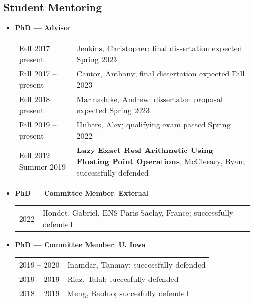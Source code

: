 \documentclass[10pt]{article}
\begin{document}
\begin{IOWA ONLY}
\subsection*{Student Mentoring}
\smallskip

\begin{itemize}

\item[] \textbf{PhD --- Advisor}
\\[1.3ex]
\begin{tabular}{l@{\quad\ }p{30em}} 
 Fall 2017 -- present
 & Jenkins, Christopher; final dissertation expected Spring 2023
 \\[.5ex]
 Fall 2017 -- present
 & Cantor, Anthony; final dissertation expected Fall 2023
 \\[.5ex]
 Fall 2018 -- present
 & Marmaduke, Andrew; dissertaton proposal expected Spring 2023
 \\[.5ex]
 Fall 2019 -- present
 & Hubers, Alex; qualifying exam passed Spring 2022
 \\[.5ex]
 Fall 2012 -- Summer 2019
 & {\bf Lazy Exact Real Arithmetic Using Floating Point Operations}, McCleeary, Ryan; successfully defended
 \\[.5ex]
\end{tabular}

\pagebreak
\item[] \textbf{PhD --- Committee Member, External}
\\[1.3ex]
\begin{tabular}{l@{\quad\ }p{30em}} 
  2022
  & Hondet, Gabriel, ENS Paris-Saclay, France; successfully defended
\end{tabular}

\item[] \textbf{PhD --- Committee Member, U. Iowa}
\\[1.3ex]
\begin{tabular}{l@{\quad\ }p{30em}} 
 2019 -- 2020
 & Inamdar, Tanmay; successfully defended
 \\[.5ex]
 2019 -- 2019
 & Riaz, Talal; succesfully defended
 \\[.5ex]
 2018 -- 2019
 & Meng, Baoluo; succesfully defended
 \\[.5ex]
\end{tabular}


\end{itemize}
\end{IOWA ONLY}
\end{document}
